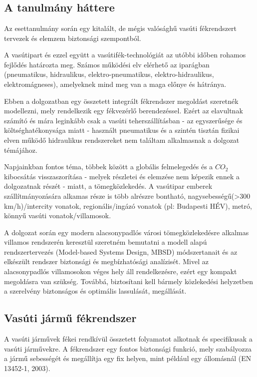 \chapter{\caseStudy}

\section{A tanulmány háttere}
Az esettanulmány során egy kitalált, de mégis valósághű vasúti fékrendszert tervezek és elemzem biztonsági szempontból.

A vasútipart és ezzel együtt a vasútifék-technológiát az utóbbi időben rohamos fejlődés határozta meg. 
Számos működési elv elérhető az iparágban (pneumatikus, hidraulikus, elektro-pneumatikus, elektro-hidraulikus, elektromágneses), amelyeknek mind meg van a maga előnye és hátránya.

Ebben a dolgozatban egy összetett integrált fékrendszer megoldást szeretnék modellezni, mely rendelkezik egy fékvezérlő berendezéssel.
Ezért az elavultnak számító és mára leginkább csak a vasúti teherszállításban - az egyszerűsége és költséghatékonysága miatt - használt pneumatikus és a szintén tisztán fizikai elven működő hidraulikus rendszereket nem találtam alkalmasnak a dolgozat témájához.

Napjainkban fontos téma, többek között a globális felmelegedés és a ${CO}_2$ kibocsátás visszaszorítása - melyek részletei és elemzése nem képezik ennek a dolgozatnak részét - miatt, a tömegközlekedés.
A vasútipar emberek szállítmányozására alkamas része is több alrészre bontható, nagysebességű(>300 km/h)/intercity vonatok, 
regionális/ingázó vonatok (pl: Budapesti HÉV), metró, könnyű vasúti vonatok/villamosok.

A dolgozat során egy modern alacsonypadlós városi tömegközlekedésre alkalmas villamos rendszerén keresztül szeretném bemutatni a modell alapú rendszertervezés (Model-based Systems Design, MBSD) módszertanait és az elkészült rendszer biztonsági és megbízhatósági analízisét. 
Mivel az alacsonypadlós villamosokon véges hely áll rendelkezésre, ezért egy kompakt megoldásra van szükség. 
Továbbá, biztosítani kell bármely közlekedési helyzetben a szerelvény biztonságos és optimális lassulását, megállását.

\section{Vasúti jármű fékrendszer} \label{sec:vjfr}
A vasúti járművek fékei rendkívül összetett folyamatot alkotnak és specifikusak a vasúti járművekre.
A fékrendszer egy fontos biztonsági funkció, mely szabályozza a jármű sebességét és megállítja egy fix helyen, mint például egy állomásnál (EN 13452-1, 2003).

